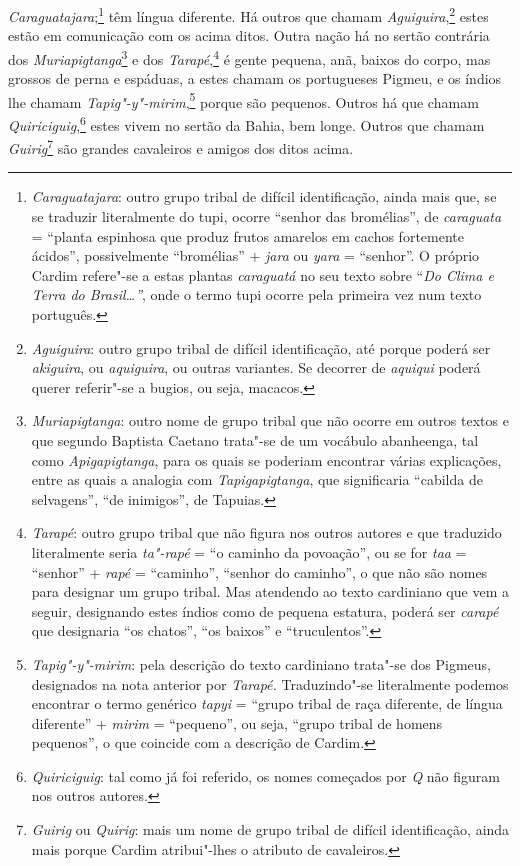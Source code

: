 \textit{Caraguatajara};\footnote{ \textit{Caraguatajara}: outro grupo
tribal de difícil identificação, ainda mais que, se se traduzir
literalmente do tupi, ocorre ``senhor das bromélias'', de
\textit{caraguata} = ``planta espinhosa que produz frutos amarelos em
cachos fortemente ácidos'', possivelmente ``bromélias'' + \textit{jara} ou
\textit{yara} = ``senhor''. O próprio Cardim refere"-se a estas plantas
\textit{caraguatá} no seu texto sobre ``\textit{Do Clima e Terra do
Brasil\ldots{}''}, onde o termo tupi ocorre pela primeira vez num texto
português.} têm língua diferente. Há outros que chamam
\textit{Aguiguira},\footnote{ \textit{Aguiguira}: outro grupo tribal
de difícil identificação, até porque poderá ser \textit{akiguira}, ou
\textit{aquiguira}, ou outras variantes. Se decorrer de
\textit{aquiqui} poderá querer referir"-se a bugios, ou seja,
macacos.} estes estão em comunicação com os acima ditos. Outra
nação há no sertão contrária dos \textit{Muriapigtanga}\footnote{ \textit{Muriapigtanga}: 
outro nome de grupo tribal que não ocorre em
outros textos e que segundo Baptista Caetano trata"-se de um vocábulo
abanheenga, tal como \textit{Apigapigtanga}, para os quais se poderiam
encontrar várias explicações, entre as quais a analogia com
\textit{Tapigapigtanga}, que significaria ``cabilda de selvagens'', ``de
inimigos'', de Tapuias.} e dos 
\textit{Tarapé},\footnote{ \textit{Tarapé}: outro grupo tribal que não figura nos
outros autores e que traduzido literalmente seria \textit{ta"-rapé} = 
``o caminho da povoação'', ou se for \textit{taa} = ``senhor'' +
\textit{rapé} = ``caminho'', ``senhor do caminho'', o que não são nomes
para designar um grupo tribal. Mas atendendo ao texto cardiniano que
vem a seguir, designando estes índios como de pequena estatura, poderá
ser \textit{carapé} que designaria ``os chatos'', ``os baixos'' e
``truculentos''.} é gente pequena, anã, baixos do corpo, mas grossos de
perna e espáduas, a estes chamam os portugueses Pigmeu, e os índios lhe
chamam \textit{Tapig"-y"-mirim},\footnote{ \textit{Tapig"-y"-mirim}: pela
descrição do texto cardiniano trata"-se dos Pigmeus, designados na nota
anterior por \textit{Tarapé.} Traduzindo"-se literalmente podemos
encontrar o termo genérico \textit{tapyi} = ``grupo tribal de raça
diferente, de língua diferente'' + \textit{mirim} = ``pequeno'', ou seja,
``grupo tribal de homens pequenos'', o que coincide com a descrição de
Cardim.} porque são pequenos. Outros há que chamam
\textit{Quiriciguig},\footnote{ \textit{Quiriciguig}: tal como já foi
referido, os nomes começados por \textit{Q} não figuram nos outros
autores.} estes vivem no sertão da Bahia, bem longe. Outros
que chamam \textit{Guirig}\footnote{ \textit{Guirig} ou \textit{Quirig}:  
mais um nome de grupo tribal de difícil identificação, ainda mais
porque Cardim atribui"-lhes o atributo de cavaleiros.} são
grandes cavaleiros e amigos dos ditos acima.

